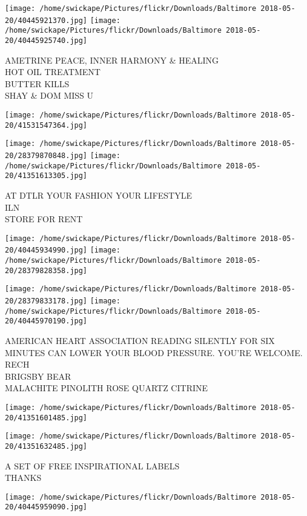 \documentclass[10pt,letterpaper]{article}
\begin{document}
\texttt{[image: /home/swickape/Pictures/flickr/Downloads/Baltimore 2018-05-20/40445921370.jpg]}
\texttt{[image: /home/swickape/Pictures/flickr/Downloads/Baltimore 2018-05-20/40445925740.jpg]}

AMETRINE PEACE, INNER HARMONY \& HEALING\\
HOT OIL TREATMENT\\
BUTTER KILLS\\
SHAY \& DOM MISS U
\pagebreak

\texttt{[image: /home/swickape/Pictures/flickr/Downloads/Baltimore 2018-05-20/41531547364.jpg]}

\vspace{0.25in}
\texttt{[image: /home/swickape/Pictures/flickr/Downloads/Baltimore 2018-05-20/28379870848.jpg]}
\texttt{[image: /home/swickape/Pictures/flickr/Downloads/Baltimore 2018-05-20/41351613305.jpg]}

AT DTLR YOUR FASHION YOUR LIFESTYLE\\
ILN\\
STORE FOR RENT
\pagebreak

\texttt{[image: /home/swickape/Pictures/flickr/Downloads/Baltimore 2018-05-20/40445934990.jpg]}
\texttt{[image: /home/swickape/Pictures/flickr/Downloads/Baltimore 2018-05-20/28379828358.jpg]}

\texttt{[image: /home/swickape/Pictures/flickr/Downloads/Baltimore 2018-05-20/28379833178.jpg]}
\texttt{[image: /home/swickape/Pictures/flickr/Downloads/Baltimore 2018-05-20/40445970190.jpg]}

AMERICAN HEART ASSOCIATION READING SILENTLY FOR SIX MINUTES CAN LOWER YOUR BLOOD PRESSURE.  YOU'RE WELCOME.\\
RECH\\
BRIGSBY BEAR\\
MALACHITE PINOLITH ROSE QUARTZ CITRINE
\pagebreak

\texttt{[image: /home/swickape/Pictures/flickr/Downloads/Baltimore 2018-05-20/41351601485.jpg]}

\vspace{0.25in}
\texttt{[image: /home/swickape/Pictures/flickr/Downloads/Baltimore 2018-05-20/41351632485.jpg]}

A SET OF FREE INSPIRATIONAL LABELS\\
THANKS
\pagebreak

\texttt{[image: /home/swickape/Pictures/flickr/Downloads/Baltimore 2018-05-20/40445959090.jpg]}
\end{document}
